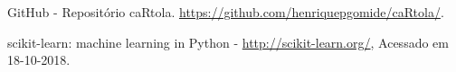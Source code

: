 \documentclass[conference]{IEEEtran}
\begin{document}
\begin{thebibliography}{00}

      GitHub     -      Repositório     caRtola.
\url{https://github.com/henriquepgomide/caRtola/}.

  scikit-learn:  machine  learning in  Python  -
\url{http://scikit-learn.org/}, Acessado em 18-10-2018.

\end{thebibliography}
\end{document}
